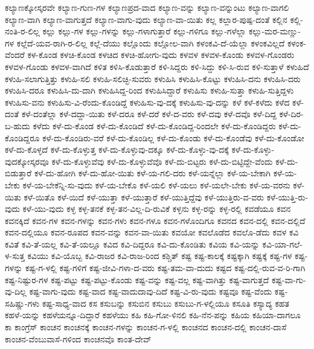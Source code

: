ಕಲ್ಯಾಣಕ್ಕೋಸ್ಕರವೇ
ಕಲ್ಯಾಣ-ಗುಣ-ಗಳ
ಕಲ್ಯಾಣಪ್ರದ-ವಾದ
ಕಲ್ಯಾಣ-ವನ್ನು
ಕಲ್ಯಾಣ-ವನ್ನುಂಟು
ಕಲ್ಯಾಣ-ವಾಗಲಿ
ಕಲ್ಯಾಣ-ವಾಗಿ
ಕಲ್ಯಾಣ-ವಾಗುತ್ತದೆ
ಕಲ್ಯಾಣ-ವಾಗು-ವುದು
ಕಲ್ಯಾಣ-ವಾ-ಯಿತು
ಕಲ್ಲ
ಕಲ್ಲಾರ-ಪುಷ್ಪ-ದಂತೆ
ಕಲ್ಲಿನ
ಕಲ್ಲಿ-ನಂತಿ-ರ-ಲಿಲ್ಲ
ಕಲ್ಲು
ಕಲ್ಲು-ಗಳ
ಕಲ್ಲು-ಗಳನ್ನು
ಕಲ್ಲು-ಗಳಾಗುತ್ತಾರೆ
ಕಲ್ಲು-ಗಳಿಗೂ
ಕಲ್ಲು-ಗಳೆಲ್ಲಾ
ಕಲ್ಲು-ಮರ-ಮಣ್ಣು-ಗಳ
ಕಲ್ಲೆದೆ-ಯವ-ರಾಗಿ-ರ-ಲಿಲ್ಲ
ಕಲ್ಲೆ-ದೆಯು
ಕಲ್ಲೊಂದು
ಕಲ್ಲೋಲ-ವಾಗಿ
ಕಳಂಕವಿ-ದೆ-ಯೆಲ್ಲಾ
ಕಳಂಕವಿಲ್ಲದೆ
ಕಳಂಕ-ವೆಂದರೆ
ಕಳ-ಕೊಂಡ
ಕಳಚಿ-ಕೊಂಡ
ಕಳಚಿದ
ಕಳಚಿ-ಹೋಗು-ವುದು
ಕಳವಳ
ಕಳವಳ-ಕೊಂಡು
ಕಳವಳ-ಗೊಂಡರು
ಕಳವಳ-ಗೊಂಡು
ಕಳವಳ-ವಾಗಿದೆ
ಕಳಿತ
ಕಳಿಸಿ-ಕೊಡುತ್ತಾರೆ
ಕಳಿ-ಸಿದ್ದರು
ಕಳಿ-ಸಿದ್ದು
ಕಳಿ-ಸಿ-ರುವ
ಕಳಿ-ಸುತ್ತಾಳೆ
ಕಳುಹಿದೆ
ಕಳುಹಿ-ಸಲಾಗುತ್ತಿತ್ತು
ಕಳುಹಿ-ಸಲಿ
ಕಳುಹಿ-ಸಲಿಚ್ಛಿ-ಸುವರು
ಕಳುಹಿಸಿ
ಕಳುಹಿಸಿ-ಕೊಟ್ಟು
ಕಳುಹಿಸಿ-ದನು
ಕಳುಹಿಸಿ-ದರು
ಕಳುಹಿಸಿ-ದರೂ
ಕಳುಹಿಸಿ-ದು-ದಾಗಿ
ಕಳುಹಿಸಿದ್ದ-ರಿಂದ
ಕಳುಹಿಸಿದ್ದಾರೆ
ಕಳುಹಿಸು
ಕಳುಹಿ-ಸುತ್ತಾ
ಕಳುಹಿ-ಸುತ್ತಿದ್ದಳು
ಕಳುಹಿಸು-ವನು
ಕಳುಹಿಸು-ವಿ-ರೆಂದು-ಕೊಂಡಿದ್ದೆ
ಕಳುಹಿಸು-ವು-ದಕ್ಕೆ
ಕಳುಹಿಸು-ವು-ದನ್ನು
ಕಳೆ
ಕಳೆ-ಕಳೆದು
ಕಳೆದ
ಕಳೆ-ದಂತೆ
ಕಳೆ-ದಂತೆಲ್ಲಾ
ಕಳೆ-ದದ್ದಾ-ಯಿತು
ಕಳೆ-ದರೂ
ಕಳೆ-ದರೆ
ಕಳೆ-ದ-ವರು
ಕಳೆ-ದವು
ಕಳೆ-ದವೊ
ಕಳೆ-ದಿದ್ದ
ಕಳೆ-ದಿರ-ಬ-ಹುದು
ಕಳೆದು
ಕಳೆ-ದು-ಕೊಂಡ
ಕಳೆ-ದು-ಕೊಂಡಿದೆ
ಕಳೆ-ದು-ಕೊಂಡಿದ್ದ-ರಿಂದಲೇ
ಕಳೆ-ದು-ಕೊಂಡಿದ್ದರು
ಕಳೆ-ದು-ಕೊಂಡಿದ್ದರೂ
ಕಳೆ-ದು-ಕೊಂಡಿರು-ವರೆ
ಕಳೆ-ದು-ಕೊಂಡಿಲ್ಲ
ಕಳೆ-ದು-ಕೊಂಡು
ಕಳೆ-ದು-ಕೊಂಡೆವು
ಕಳೆ-ದು-ಕೊಂಡೋ
ಕಳೆ-ದು-ಕೊಳ್ಳದೆ
ಕಳೆ-ದು-ಕೊಳ್ಳುತ್ತ
ಕಳೆ-ದು-ಕೊಳ್ಳುವು-ದಕ್ಕೂ
ಕಳೆ-ದು-ಕೊಳ್ಳು-ವು-ದಕ್ಕೆ
ಕಳೆ-ದು-ಕೊಳ್ಳು-ವುದಕ್ಕೋಸ್ಕರವೂ
ಕಳೆ-ದು-ಕೊಳ್ಳುವೆವು
ಕಳೆ-ದು-ಕೊಳ್ಳುವೆವೊ
ಕಳೆ-ದು-ಬಿಟ್ಟರು
ಕಳೆ-ದು-ಬಿಟ್ಟಿದ್ದೇ-ವೆಂದು
ಕಳೆ-ದು-ಬಿಡುತ್ತಾರೆ
ಕಳೆ-ದು-ಹೋಗಿ
ಕಳೆ-ದು-ಹೋ-ಯಿತು
ಕಳೆ-ಯ-ಗಲಿ-ದರು
ಕಳೆ-ಯನ್ನೆಲ್ಲಾ
ಕಳೆ-ಯ-ಬೇಕಾಗಿ
ಕಳೆ-ಯ-ಬೇಕು
ಕಳೆ-ಯ-ಬೇಕೆನ್ನಿ-ಸು-ವುದು
ಕಳೆ-ಯ-ಬೇಕೊ
ಕಳೆ-ಯಲಿ
ಕಳೆ-ಯಲು
ಕಳೆ-ಯಲೇ-ಬೇಕು
ಕಳೆ-ಯ-ವರನು
ಕಳೆ-ಯಿತು
ಕಳೆ-ಯಿತೊ
ಕಳೆ-ಯಿದೆ
ಕಳೆ-ಯುತ್ತಾ
ಕಳೆ-ಯುತ್ತಾರೆ
ಕಳೆ-ಯುತ್ತಿದ್ದೆವು
ಕಳೆ-ಯುತ್ತಿರು-ವ-ವರು
ಕಳೆ-ಯುತ್ತಿ-ರು-ವುದು
ಕಳೆ-ಯು-ವುದು
ಕಳ್ಳ
ಕಳ್ಳ-ತನಕೆ
ಕಳ್ಳ-ತನ-ವಿಲ್ಲ-ದಿ-ರುವಿಕೆ
ಕಳ್ಳನು
ಕಳ್ಳ-ರನ್ನು
ಕಳ್ಳ-ರಲ್ಲಿ
ಕವಡೆಯೂ
ಕವನ
ಕವನಕ್ಕಿದೆ
ಕವನ-ಗಳ
ಕವನ-ಗಳನ್ನು
ಕವನ-ಗಳು
ಕವನ-ಗಳೂ
ಕವನ-ಗಳೊಂದಿಗೂ
ಕವನದ
ಕವನ-ದಲ್ಲಿ
ಕವನ-ದಲ್ಲಿದೆ
ಕವನ-ದಲ್ಲಿಯೂ
ಕವನ-ರೂಪದ
ಕವನ-ವನ್ನು
ಕವನ-ವಾ-ಯಿತು
ಕವಯೋ
ಕವಲೊಡೆದ
ಕವಲೊ-ಡೆದು
ಕವಳ
ಕವಿ
ಕವಿತೆ
ಕವಿ-ತೆ-ಯಲ್ಲ
ಕವಿ-ತೆ-ಯಲ್ಲೂ
ಕವಿದ
ಕವಿ-ದಿದ್ದರೂ
ಕವಿ-ದು-ಕೊಂಡಿತು
ಕವಿಯ
ಕವಿ-ಯನ್ನು
ಕವಿ-ಯಾ-ಗಲೆ-ಳ-ಸುತ್ತ
ಕವಿಯು
ಕವಿ-ಯೊಬ್ಬ
ಕವಿ-ರಾಜರ
ಕವಿ-ರಾಜ-ರಿಂದ
ಕಶ್ಚಿತ್
ಕಷ್ಟ
ಕಷ್ಟ-ಕಾಲಕ್ಕೆ
ಕಷ್ಟಕ್ಕಾಗಿ
ಕಷ್ಟಕ್ಕೆ
ಕಷ್ಟ-ಗಳ
ಕಷ್ಟ-ಗಳನ್ನು
ಕಷ್ಟ-ಗ-ಳಲ್ಲಿ
ಕಷ್ಟ-ಗಳಿಗೆ
ಕಷ್ಟ-ಜೀವಿ-ಗಳಾ-ದ-ವರು
ಕಷ್ಟ-ತಮ-ವಾ-ದುದು
ಕಷ್ಟದ
ಕಷ್ಟ-ದಲ್ಲಿ-ರುವ-ವ-ರಿ-ಗಾಗಿ
ಕಷ್ಟ-ನಿಷ್ಟುರ-ಗಳ
ಕಷ್ಟ-ಪಟ್ಟು
ಕಷ್ಟ-ಪಟ್ಟು-ಕೊಂಡು
ಕಷ್ಟ-ವನ್ನು
ಕಷ್ಟ-ವಲ್ಲ
ಕಷ್ಟ-ವಾಗಿತ್ತು
ಕಷ್ಟ-ವಾಗುತ್ತದೆ
ಕಷ್ಟ-ವಾ-ಗು-ವು-ದಿಲ್ಲ
ಕಷ್ಟ-ವಾಗು-ವುದು
ಕಷ್ಟ-ವಾದ
ಕಷ್ಟ-ವಾದುದಾವು-ದಿದೆ
ಕಷ್ಟ-ವಿ-ರು-ವುದು
ಕಷ್ಟವೂ
ಕಷ್ಟ-ವೆಂದು
ಕಷ್ಟ-ಸಹಿಷ್ಣು-ಗಳು
ಕಷ್ಟ-ಸಾಧ್ಯ-ವಾದ
ಕಸ
ಕಸುಬನ್ನು
ಕಸುಬಿನ
ಕಸುಬು
ಕಸುಬು-ಗ-ಳಲ್ಲಿಯೂ
ಕಸೂತಿ
ಕಸ್ಯಾದ್ಯ
ಕಹತ
ಕಹಳೆ-ಯನ್ನು
ಕಹಳೆಯನ್ನೂ-ದಿದ್ದಾರೆ
ಕಹಳೆಯು
ಕಹಿ
ಕಹಿ-ಗೋ-ಳಿನಲಿ
ಕಹಿ-ನೆನ-ಪನ್ನು
ಕಹಿಯ
ಕಹಿಯಾ-ದಾಗಲೂ
ಕಾ
ಕಾಂಗ್ರೆಸ್
ಕಾಂಚನ
ಕಾಂಚನಕ್ಕೆ
ಕಾಂಚನ-ಗಳನ್ನು
ಕಾಂಚನ-ಗ-ಳಲ್ಲಿ
ಕಾಂಚನದ
ಕಾಂಚನ-ದಲ್ಲಿ
ಕಾಂಚನ-ದಾಸೆ
ಕಾಂಚನ-ವೆಂಬುವಾಸೆ-ಗಳಿಂದ
ಕಾಂಚನವೊ
ಕಾಂತ-ದೇವ್
